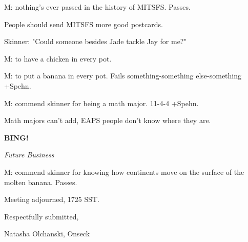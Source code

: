 \documentclass[12pt]{article}
\newcommand{\bing}{{\bf BING!} }
\newcommand{\goto}[1]{\bing \vskip 12pt \centerline{{\em{#1}}}}
\begin{document}
M: nothing's ever passed in the history of MITSFS. Passes.

People should send MITSFS more good postcards.

Skinner: "Could someone besides Jade tackle Jay for me?"

M: to have a chicken in every pot.

M: to put a banana in every pot. Fails something-something else-something +Spehn.

M: commend skinner for being a math major. 11-4-4 +Spehn.

Math majors can't add, EAPS people don't know where they are.

\goto{Future Business}

M: commend skinner for knowing how continents move on the surface of the molten banana. Passes.

\vspace{12pt}

\noindent
Meeting adjourned, 1725 SST.

\vspace{18pt}

\centerline{Respectfully submitted,}
\centerline{Natasha Olchanski, Onseck}
\end{document}

